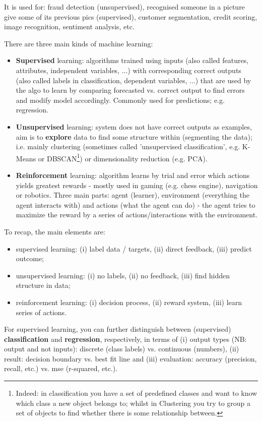 \documentclass[11pt]{article}
\begin{document}
It is used for: fraud detection (unsupervised), recognised someone in a picture give some of its previous pics (supervised), customer segmentation, credit scoring, image recognition, sentiment analysis, etc.

There are three main kinds of machine learning:
\begin{itemize}
	\item \textbf{Supervised} learning: algorithms trained using inputs (also called features, attributes, independent variables, ...) with corresponding correct outputs (also called labels in classification, dependent variables, ...) that are used by the algo to learn by comparing forecasted vs. correct output to find errors and modify model accordingly. Commonly used for predictions; e.g. regression.
	\item \textbf{Unsupervised} learning: system does not have correct outputs as examples, aim is to \textbf{explore} data to find some structure within (segmenting the data); i.e. mainly clustering (sometimes called 'unsupervised classification', e.g. K-Means or DBSCAN\footnote{Indeed: in classification you have a set of predefined classes and want to know which class a new object belongs to; whilst in Clustering you try to group a set of objects to find whether there is some relationship between.}) or dimensionality reduction (e.g. PCA).
	\item \textbf{Reinforcement} learning: algorithm learns by trial and error which actions yields greatest rewards - mostly used in gaming (e.g. chess engine), navigation or robotics. Three main parts: agent (learner), environment (everything the agent interacts with) and actions (what the	agent can do) - the agent tries to maximize the reward by a series of actions/interactions with the environment.
\end{itemize}

To recap, the main elements are:
\begin{itemize}
	\item supervised learning: (i) label data / targets, (ii) direct feedback, (iii) predict outcome;
	\item unsupervised learning: (i) no labels, (ii) no feedback, (iii) find hidden structure in data;
	\item reinforcement learning: (i) decision process, (ii) reward system, (iii) learn series of actions.
\end{itemize}

For supervised learning, you can further distinguish between (supervised) \textbf{classification} and \textbf{regression}, respectively, in terms of (i) output types (NB: output and not inputs): discrete (class labels) vs. continuous (numbers), (ii) result: decision boundary vs. best fit line and (iii) evaluation: accuracy (precision, recall, etc.) vs. mse (r-squared, etc.).
\end{document}
